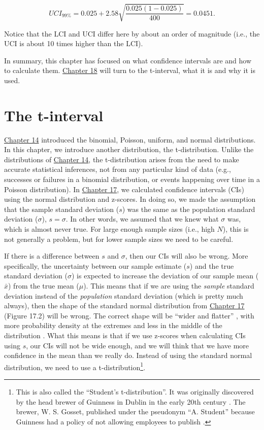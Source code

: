 \documentclass[
]{scrbook}
\begin{document}
\[UCI_{99\%} = 0.025 + 2.58 \sqrt{\frac{0.025\left(1 - 0.025\right)}{400}} = 0.0451.\]

Notice that the LCI and UCI differ here by about an order of magnitude (i.e., the UCI is about 10 times higher than the LCI).

In summary, this chapter has focused on what confidence intervals are and how to calculate them.
\protect\hyperlink{Chapter_18}{Chapter 18} will turn to the t-interval, what it is and why it is used.

\hypertarget{Chapter_18}{%
\chapter{The t-interval}\label{Chapter_18}}

\protect\hyperlink{Chapter_14}{Chapter 14} introduced the binomial, Poisson, uniform, and normal distributions.
In this chapter, we introduce another distribution, the t-distribution.
Unlike the distributions of \protect\hyperlink{Chapter_14}{Chapter 14}, the t-distribution arises from the need to make accurate statistical inferences, not from any particular kind of data (e.g., successes or failures in a binomial distribution, or events happening over time in a Poisson distribution).
In \protect\hyperlink{Chapter_17}{Chapter 17}, we calculated confidence intervals (CIs) using the normal distribution and z-scores.
In doing so, we made the assumption that the sample standard deviation (\(s\)) was the same as the population standard deviation (\(\sigma\)), \(s = \sigma\).
In other words, we assumed that we knew what \(\sigma\) was, which is almost never true.
For large enough sample sizes (i.e., high \(N\)), this is not generally a problem, but for lower sample sizes we need to be careful.

If there is a difference between \(s\) and \(\sigma\), then our CIs will also be wrong.
More specifically, the uncertainty between our sample estimate (\(s\)) and the true standard deviation (\(\sigma\)) is expected to increase the deviation of our sample mean (\(\bar{x}\)) from the true mean (\(\mu\)).
This means that if we are using the \emph{sample} standard deviation instead of the \emph{population} standard deviation (which is pretty much always), then the shape of the standard normal distribution from \protect\hyperlink{Chapter_17}{Chapter 17} (Figure 17.2) will be wrong.
The correct shape will be ``wider and flatter'' \citep{Sokal1995}, with more probability density at the extremes and less in the middle of the distribution \citep{Box1978}.
What this means is that if we use z-scores when calculating CIs using \(s\), our CIs will not be wide enough, and we will think that we have more confidence in the mean than we really do.
Instead of using the standard normal distribution, we need to use a t-distribution\footnote{This is also called the ``Student's t-distribution''. It was originally discovered by the head brewer of Guinness in Dublin in the early 20th century \citep{Box1978}. The brewer, W. S. Gosset, published under the pseudonym ``A. Student'' because Guinness had a policy of not allowing employees to publish \citep{Miller2004}.}.
\end{document}
